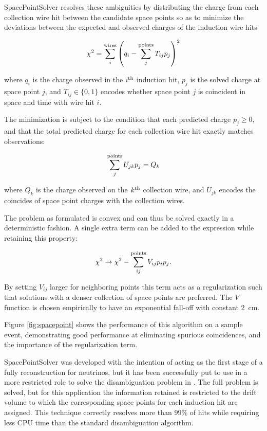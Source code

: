 SpacePointSolver resolves these ambiguities by distributing the charge from each collection wire hit between the candidate space points so as to minimize the deviations between the expected and observed charges of the induction wire hits

\begin{equation}
\chi^2 = \sum_i^{\rm wires} \left(q_i - \sum_j^{\rm points}T_{ij}p_j\right)^2
\end{equation}

where $q_i$ is the charge observed in the $i^{\rm th}$ induction hit, $p_j$ is the solved charge at space point $j$, and $T_{ij}\in\{0,1\}$ encodes whether space point $j$ is coincident in space and time with wire hit $i$.

The minimization is subject to the condition that each predicted charge $p_j\ge0$, and that the total predicted charge for each collection wire hit exactly matches observations:

\begin{equation}
\sum_j^{\rm points}U_{jk}p_j=Q_k
\end{equation}

where $Q_k$ is the charge observed on the $k^{\rm th}$ collection wire, and $U_{jk}$ encodes the coincides of space point charges with the collection wires.

The problem as formulated is convex and can thus be solved exactly in a deterministic fashion. A single extra term can be added to the expression while retaining this property:

\begin{equation}
\chi^2 \to \chi^2 - \sum_{ij}^{\rm points}V_{ij}p_ip_j .
\end{equation}

By setting $V_{ij}$ larger for neighboring points this term acts as a regularization such that solutions with a denser collection of space points are preferred. The $V$ function is chosen empirically to have an exponential fall-off with constant \SI{2}{cm}.

Figure \ref{fig:spacepoint} shows the performance of this algorithm on a sample   event, demonstrating good performance at eliminating spurious coincidences, and the importance of the regularization term.

SpacePointSolver was developed with the intention of acting as the first stage of a fully \threed reconstruction for  neutrinos, but it has been successfully put to use in a more restricted role to solve the disambiguation problem in . The full problem is solved, but for this application the information retained is restricted to the drift volume to which the corresponding space points for each induction hit are assigned. This technique correctly resolves more than 99\% of hits while requiring less CPU time than the standard disambiguation algorithm.

